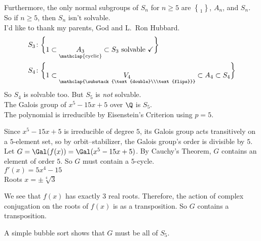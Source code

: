 Furthermore, the only normal subgroups of $S_n$ for $n\geq5$ are $\brace1$, $A_n$, and $S_n$.  So if $n\geq5$, then $S_n$ isn't solvable. \\
I'd like to thank my parents, God and L.~Ron Hubbard.
\begin{align*}
S_3\colon & \brace1 \subset \underset{\mathclap{\text{cyclic}}}{A_3} \subset S_3 \text{ solvable } \checkmark \\
S_4\colon & \brace1 \subset \underset{\mathclap{\substack{\text{double}\\\text{flips}}}}{V_4} \subset A_4 \subset S_4
\end{align*}
So $S_4$ is solvable too.  But $S_5$ is \emph{not} solvable. \\
\eg The Galois group of $x^5-15x+5$ over $\Q$ is $S_5$. \\
\pf The polynomial is irreducible by Eisenstein's Criterion using $p=5$.

Since $x^5-15x+5$ is irreducible of degree $5$, its Galois group acts transitively on a $5$-element set, so by orbit--stabilizer, the Galois group's order is divisible by $5$.  Let $G=\Gal(f(x))=\Gal(x^5-15x+5)$.  By Cauchy's Theorem, $G$ contains an element of order $5$.  So $G$ must contain a $5$-cycle. \\
$f'(x)=5x^4-15$ \\
Roots $x=\pm\sqrt[4]{3}$ \\
\begin{center}
\end{center}
We see that $f(x)$ has exactly $3$ real roots.  Therefore, the action of complex conjugation on the roots of $f(x)$ is as a transposition.  So $G$ contains a transposition.

A simple bubble sort shows that $G$ must be all of $S_5$.

